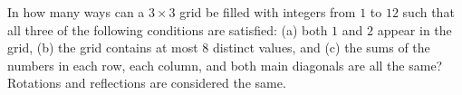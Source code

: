 
In how many ways can a $3 \times 3$ grid be filled with integers from $1$ to $12$ such that all three of the following conditions are satisfied: (a) both $1$ and $2$ appear in the grid, (b) the grid contains at most $8$ distinct values, and (c) the sums of the numbers in each row, each column, and both main diagonals are all the same? Rotations and reflections are considered the same.
